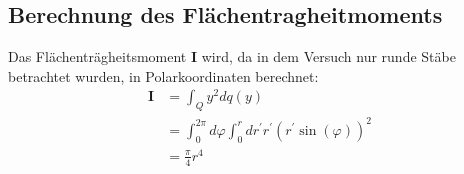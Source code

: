 \subsection{Berechnung des Flächentragheitmoments}
\label{sec:flaechentraegheitsmoment}
Das Flächenträgheitsmoment $\mathbf{I}$ wird, da in dem Versuch nur runde Stäbe betrachtet wurden,
in Polarkoordinaten berechnet:
\begin{align}
	\mathbf{I} 
	&= \int_Q y^2 dq(y) 
	\\
	&= \int_0^{2\pi} d\varphi \int_0^r dr^\prime r^\prime 
	\left( r^\prime\sin(\varphi) \right)^2
	\\
	&= \frac{\pi}{4} r^4
\end{align}


\cite{sample}
